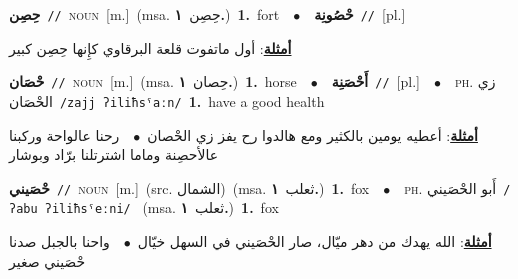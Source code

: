 \documentclass[10pt,a4paper,twoside]{article} %
\begin{document}
\begin{multicols}{2}
{\setlength\topsep{0pt}\textbf{\foreignlanguage{arabic}{حِصِن}}\ {\color{gray}\texttt{//}\color{black}}\ \textsc{noun}\ [m.]\ \color{gray}(msa. \foreignlanguage{arabic}{حِصِن}~\foreignlanguage{arabic}{\textbf{١.}})\color{black}\ \textbf{1.}~fort\ \ $\bullet$\ \ \setlength\topsep{0pt}\textbf{\foreignlanguage{arabic}{حْصُونِة}}\ {\color{gray}\texttt{//}\color{black}}\ [pl.]\  \begin{flushright}\color{gray}\foreignlanguage{arabic}{\textbf{\underline{\foreignlanguage{arabic}{أمثلة}}}: أول ماتفوت قلعة البرقاوي كإِنها حِصِن كبير}\end{flushright}\color{black}} \vspace{2mm}

{\setlength\topsep{0pt}\textbf{\foreignlanguage{arabic}{حْصَان}}\ {\color{gray}\texttt{//}\color{black}}\ \textsc{noun}\ [m.]\ \color{gray}(msa. \foreignlanguage{arabic}{حِصان}~\foreignlanguage{arabic}{\textbf{١.}})\color{black}\ \textbf{1.}~horse\ \ $\bullet$\ \ \setlength\topsep{0pt}\textbf{\foreignlanguage{arabic}{أَحْصَنِة}}\ {\color{gray}\texttt{//}\color{black}}\ [pl.]\ \ $\bullet$\ \ \textsc{ph.} \color{gray} \foreignlanguage{arabic}{زي الحْصَان}\color{black}\ {\color{gray}\texttt{/{\sffamily zajj ʔiliħsˤaːn}/}\color{black}}\ \textbf{1.}~have a good health\  \begin{flushright}\color{gray}\foreignlanguage{arabic}{\textbf{\underline{\foreignlanguage{arabic}{أمثلة}}}: أعطيه يومين بالكثير ومع هالدوا رح يفز زي الحْصان\ $\bullet$\ \  رحنا عالواحة وركبنا عالأحصِنة وماما اشترتلنا برّاد وبوشار}\end{flushright}\color{black}} \vspace{2mm}

{\setlength\topsep{0pt}\textbf{\foreignlanguage{arabic}{حْصَيني}}\ {\color{gray}\texttt{//}\color{black}}\ \textsc{noun}\ [m.]\ (src. \color{gray}\foreignlanguage{arabic}{الشمال}\color{black})\ \color{gray}(msa. \foreignlanguage{arabic}{ثعلب}~\foreignlanguage{arabic}{\textbf{١.}})\color{black}\ \textbf{1.}~fox\ \ $\bullet$\ \ \textsc{ph.} \color{gray} \foreignlanguage{arabic}{أَبو الحْصَيني}\color{black}\ {\color{gray}\texttt{/{\sffamily ʔabu ʔiliħsˤeːni}/}\color{black}}\ \color{gray} (msa. \foreignlanguage{arabic}{ثعلب}~\foreignlanguage{arabic}{\textbf{١.}})\color{black}\ \textbf{1.}~fox\  \begin{flushright}\color{gray}\foreignlanguage{arabic}{\textbf{\underline{\foreignlanguage{arabic}{أمثلة}}}: الله يهدك من دهر ميّال، صار الحْصَيني في السهل خيّال\ $\bullet$\ \  واحنا بالجبل صدنا حْصَيني صغير}\end{flushright}\color{black}} \vspace{2mm}


\end{multicols}
\end{document}
